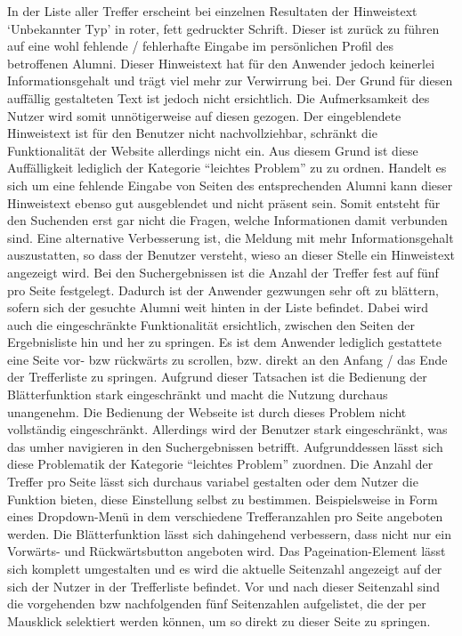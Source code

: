 {
	In der Liste aller Treffer erscheint bei einzelnen Resultaten der Hinweistext ‘Unbekannter Typ’ in roter, fett gedruckter Schrift. Dieser ist zurück zu führen auf eine wohl fehlende / fehlerhafte Eingabe im persönlichen Profil des betroffenen Alumni. Dieser Hinweistext hat für den Anwender jedoch keinerlei Informationsgehalt und trägt viel mehr zur Verwirrung bei. Der Grund für diesen auffällig gestalteten Text ist jedoch nicht ersichtlich. Die Aufmerksamkeit des Nutzer wird somit unnötigerweise auf diesen gezogen.
}
{
	Der eingeblendete Hinweistext ist für den Benutzer nicht nachvollziehbar, schränkt die Funktionalität der Website allerdings nicht ein. Aus diesem Grund ist diese Auffälligkeit lediglich der Kategorie “leichtes Problem” zu zu ordnen.
}
{
	Handelt es sich um eine fehlende Eingabe von Seiten des entsprechenden Alumni kann dieser Hinweistext ebenso gut ausgeblendet und nicht präsent sein. Somit entsteht für den Suchenden erst gar nicht die Fragen, welche Informationen damit verbunden sind. Eine alternative Verbesserung ist, die Meldung mit mehr Informationsgehalt auszustatten, so dass der Benutzer versteht, wieso an dieser Stelle ein Hinweistext angezeigt wird.
}
{
	Bei den Suchergebnissen ist die Anzahl der Treffer fest auf fünf pro Seite festgelegt. Dadurch ist der Anwender gezwungen sehr oft zu blättern, sofern sich der gesuchte Alumni weit hinten in der Liste befindet. Dabei wird auch die eingeschränkte Funktionalität ersichtlich, zwischen den Seiten der Ergebnisliste hin und her zu springen. Es ist dem Anwender lediglich gestattete eine Seite vor- bzw rückwärts zu scrollen, bzw. direkt an den Anfang / das Ende der Trefferliste zu springen. Aufgrund dieser Tatsachen ist die Bedienung der Blätterfunktion stark eingeschränkt und macht die Nutzung durchaus unangenehm.
}
{
	Die Bedienung der Webseite ist durch dieses Problem nicht vollständig eingeschränkt. Allerdings wird der Benutzer stark eingeschränkt, was das umher navigieren in den Suchergebnissen betrifft. Aufgrunddessen lässt sich diese Problematik der Kategorie “leichtes Problem” zuordnen.}
{
	Die Anzahl der Treffer pro Seite lässt sich durchaus variabel gestalten oder dem Nutzer die Funktion bieten, diese Einstellung selbst zu bestimmen. Beispielsweise in Form eines Dropdown-Menü in dem verschiedene Trefferanzahlen pro Seite angeboten werden. Die Blätterfunktion lässt sich dahingehend verbessern, dass nicht nur ein Vorwärts- und Rückwärtsbutton angeboten wird. Das Pageination-Element lässt sich komplett umgestalten und es wird die aktuelle Seitenzahl angezeigt auf der sich der Nutzer in der Trefferliste befindet. Vor und nach dieser Seitenzahl sind die vorgehenden bzw nachfolgenden fünf Seitenzahlen aufgelistet, die der per Mausklick selektiert werden können, um so direkt zu dieser Seite zu springen.
}